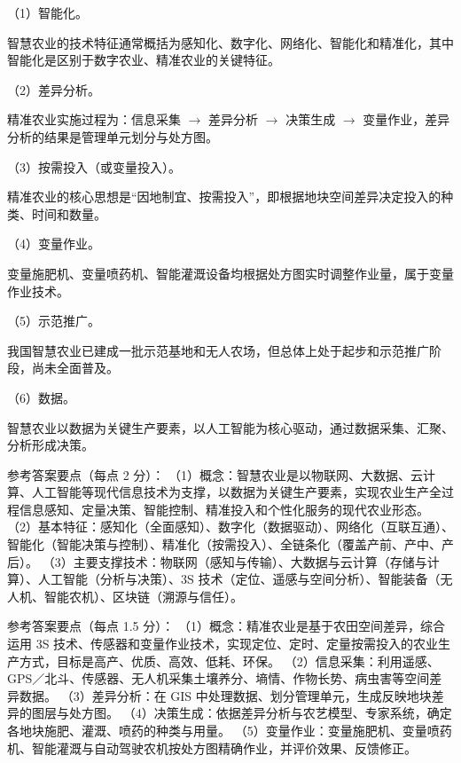 \documentclass[a4paper,11pt]{article}
\begin{document}
\q （1）智能化。\begin{analysis}智慧农业的技术特征通常概括为感知化、数字化、网络化、智能化和精准化，其中智能化是区别于数字农业、精准农业的关键特征。\end{analysis}

\q （2）差异分析。\begin{analysis}精准农业实施过程为：信息采集 $\rightarrow$ 差异分析 $\rightarrow$ 决策生成 $\rightarrow$ 变量作业，差异分析的结果是管理单元划分与处方图。\end{analysis}

\q （3）按需投入（或变量投入）。\begin{analysis}精准农业的核心思想是“因地制宜、按需投入”，即根据地块空间差异决定投入的种类、时间和数量。\end{analysis}

\q （4）变量作业。\begin{analysis}变量施肥机、变量喷药机、智能灌溉设备均根据处方图实时调整作业量，属于变量作业技术。\end{analysis}

\q （5）示范推广。\begin{analysis}我国智慧农业已建成一批示范基地和无人农场，但总体上处于起步和示范推广阶段，尚未全面普及。\end{analysis}

\q （6）数据。\begin{analysis}智慧农业以数据为关键生产要素，以人工智能为核心驱动，通过数据采集、汇聚、分析形成决策。\end{analysis}


\q 参考答案要点（每点 2 分）：
（1）概念：智慧农业是以物联网、大数据、云计算、人工智能等现代信息技术为支撑，以数据为关键生产要素，实现农业生产全过程信息感知、定量决策、智能控制、精准投入和个性化服务的现代农业形态。
（2）基本特征：感知化（全面感知）、数字化（数据驱动）、网络化（互联互通）、智能化（智能决策与控制）、精准化（按需投入）、全链条化（覆盖产前、产中、产后）。
（3）主要支撑技术：物联网（感知与传输）、大数据与云计算（存储与计算）、人工智能（分析与决策）、3S 技术（定位、遥感与空间分析）、智能装备（无人机、智能农机）、区块链（溯源与信任）。

\q 参考答案要点（每点 1.5 分）：
（1）概念：精准农业是基于农田空间差异，综合运用 3S 技术、传感器和变量作业技术，实现定位、定时、定量按需投入的农业生产方式，目标是高产、优质、高效、低耗、环保。
（2）信息采集：利用遥感、GPS／北斗、传感器、无人机采集土壤养分、墒情、作物长势、病虫害等空间差异数据。
（3）差异分析：在 GIS 中处理数据、划分管理单元，生成反映地块差异的图层与处方图。
（4）决策生成：依据差异分析与农艺模型、专家系统，确定各地块施肥、灌溉、喷药的种类与用量。
（5）变量作业：变量施肥机、变量喷药机、智能灌溉与自动驾驶农机按处方图精确作业，并评价效果、反馈修正。
\end{document}
